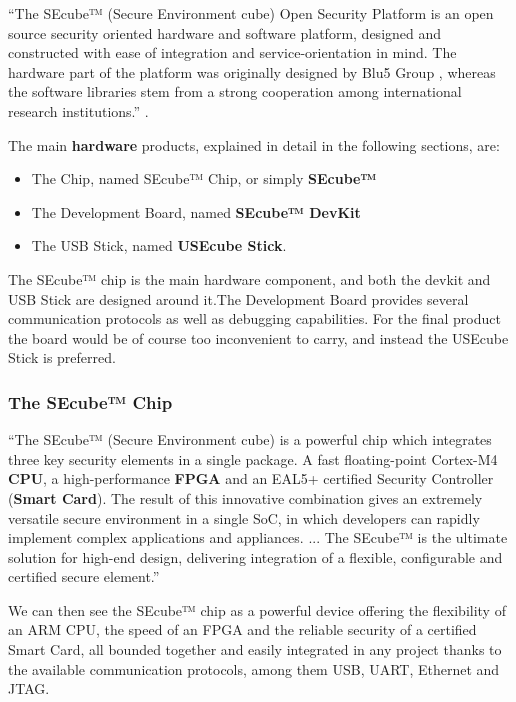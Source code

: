 ``The SEcube™ (Secure Environment cube) Open Security Platform is an open source security oriented hardware and software platform, designed and constructed with ease of integration and service-orientation in mind. The hardware part of the platform was originally designed by Blu5 Group \cite{Blu5}, whereas the software libraries stem from a strong cooperation among international research institutions.'' \cite{GetStart}.

\vspace{5pt}

The main \textbf{hardware} products, explained in detail in the following sections, are:
\begin{itemize}
\setlength\itemsep{0pt}
\item The Chip, named SEcube™ Chip, or simply \textbf{SEcube™}
\item The Development Board, named \textbf{SEcube™ DevKit}
\item The USB Stick, named \textbf{USEcube Stick}.
\end{itemize}

The SEcube™ chip is the main hardware component, and both the devkit and USB Stick are designed around it.The Development Board provides several communication protocols as well as debugging capabilities. For the final product the board would be of course too inconvenient to carry, and instead the USEcube Stick is preferred.

\subsubsection{The SEcube™ Chip}

``The SEcube™ (Secure Environment cube) is a powerful chip which
integrates three key security elements in a single package. A fast
floating-point Cortex-M4 \textbf{CPU}, a high-performance \textbf{FPGA} and an
EAL5+ certified Security Controller (\textbf{Smart Card}).
The result of this innovative combination gives an extremely
versatile secure environment in a single SoC, in which developers
can rapidly implement complex applications and appliances.
... The SEcube™ is the ultimate solution for high-end design,
delivering integration of a flexible, configurable and certified
secure element.'' \cite{SEcubeDS}

We can then see the SEcube™ chip as a powerful device offering the flexibility of an \textsc{ARM} CPU, the speed of an FPGA and the reliable security of a certified Smart Card, all bounded together and easily integrated in any project thanks to the available communication protocols, among them USB, UART, Ethernet and JTAG. 

